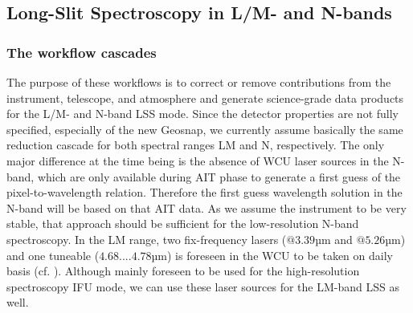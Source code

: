 \subsection{Long-Slit Spectroscopy in L/M- and N-bands}\label{lss:overview}
\subsubsection{The workflow cascades}\label{lss:cascade_overview}
The purpose of these workflows is to correct or remove contributions from
the instrument, telescope, and atmosphere and generate science-grade
data products for the L/M- and N-band \ac{LSS}
mode. Since the detector properties are not fully specified, especially of the new Geosnap, we currently assume
basically the same reduction cascade for both spectral ranges LM and
N, respectively. The only major difference at the time being is the absence of \ac{WCU} laser sources in the N-band, which are only available during \ac{AIT} phase to generate a first guess of the pixel-to-wavelength relation. Therefore the first guess wavelength solution in the N-band will be based on that \ac{AIT} data. As we assume the instrument to be very stable, that approach should be sufficient for the low-resolution N-band spectroscopy. In the LM range, two fix-frequency lasers ($@3.39$µm and $@5.26$µm) and one tuneable ($4.68....4.78$µm) is foreseen in the \ac{WCU} to be taken on daily basis (cf. \cite{METIS-calibration_plan}). Although mainly foreseen to be used for the high-resolution spectroscopy \ac{IFU} mode, we can use these laser sources for the LM-band \ac{LSS} as well.

